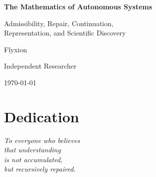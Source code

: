 \documentclass[11pt,oneside]{book}
\numberwithin{equation}{chapter}
\theoremstyle{definition}
\theoremstyle{plain}
\begin{document}
\begin{titlepage}

\centering

\vspace*{2.5cm}

{\Huge\bfseries
The Mathematics of Autonomous Systems\par}

\vspace{0.8cm}

{\Large
Admissibility, Repair, Continuation,\\
Representation, and Scientific Discovery\par}

\vfill

{\Large
Flyxion\par}

\vspace{0.3cm}

{\large
Independent Researcher\par}

\vfill

{\large
\today\par}

\end{titlepage}

\frontmatter

\chapter*{Dedication}

\begin{flushright}
\emph{
To everyone who believes\\
that understanding\\
is not accumulated,\\
but recursively repaired.
}
\end{flushright}

\cleardoublepage
\end{document}

